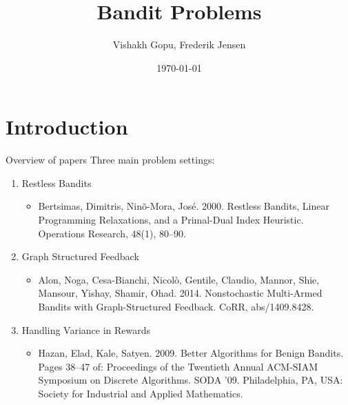 \documentclass{beamer}
\title{Bandit Problems}
\date{\today}
\author{Vishakh Gopu, Frederik Jensen}
\institute{Advanced Machine Learning - Spring 2017}
\begin{document}
\maketitle


\section{Introduction}
\begin{frame}{Overview of papers}   
  Three main problem settings: 
  \begin{enumerate}
  \item
    Restless Bandits
    \begin{itemize}
    \item
      Bertsimas, Dimitris, Nin\~o-Mora, Jos\'e. 2000. Restless Bandits, Linear Programming
      Relaxations, and a Primal-Dual Index Heuristic. Operations Research, 48(1), 80–90.
    \end{itemize}
  \item
    Graph Structured Feedback
    \begin{itemize}
    \item
      Alon, Noga, Cesa-Bianchi, Nicol\`o, Gentile, Claudio, Mannor, Shie, Mansour, Yishay,
      Shamir, Ohad. 2014. Nonstochastic Multi-Armed Bandits with Graph-Structured Feedback.
      CoRR, abs/1409.8428.
    \end{itemize}
  \item
    Handling Variance in Rewards
    \begin{itemize}
    \item
      Hazan, Elad, Kale, Satyen. 2009. Better Algorithms for Benign Bandits. Pages 38–47 of: 
      Proceedings of the Twentieth Annual ACM-SIAM Symposium on Discrete Algorithms. SODA '09.
      Philadelphia, PA, USA: Society for Industrial and Applied Mathematics.
    \end{itemize}
  \end{enumerate}
\end{frame}
\end{document}
